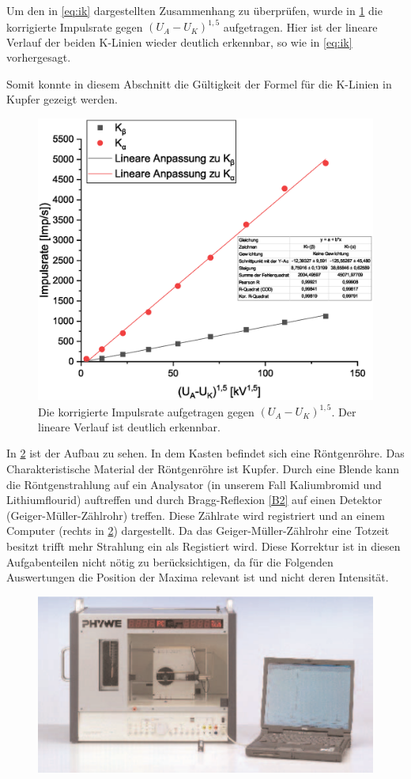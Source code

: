 \documentclass[
	a4paper,
	12pt,
	pagesize,
	ngerman
]{scrartcl}
\begin{document}
 Um den in \cref{eq:ik} dargestellten Zusammenhang zu überprüfen, wurde in \cref{spannung2} die korrigierte Impulsrate gegen $(U_A - U_K)^{1,5}$ aufgetragen. Hier ist der lineare Verlauf der beiden K-Linien wieder deutlich erkennbar, so wie in \cref{eq:ik} vorhergesagt.
 
 Somit konnte in diesem Abschnitt die Gültigkeit der Formel für die K-Linien in Kupfer gezeigt werden.

\begin{figure}[h!]
	\centering
	\includegraphics[scale = 0.6]{spannung2.eps}
	\caption{Die korrigierte Impulsrate aufgetragen gegen $(U_A-U_K)^{1,5}$. Der lineare Verlauf ist deutlich erkennbar.}
	\label{spannung2}
\end{figure}
In \cref{B1} ist der Aufbau zu sehen. In dem Kasten befindet sich eine Röntgenröhre. Das Charakteristische Material der Röntgenröhre ist Kupfer. Durch eine Blende kann die Röntgenstrahlung auf ein Analysator (in unserem Fall Kaliumbromid und Lithiumflourid) auftreffen und durch Bragg-Reflexion \cref{B2} auf einen Detektor (Geiger-Müller-Zählrohr) treffen. Diese Zählrate wird registriert und an einem Computer (rechts in \cref{B1}) dargestellt. Da das Geiger-Müller-Zählrohr eine Totzeit besitzt trifft mehr Strahlung ein als Registiert wird. Diese Korrektur ist in diesen Aufgabenteilen nicht nötig zu berücksichtigen, da für die Folgenden Auswertungen die Position der Maxima relevant ist und nicht deren Intensität.
\begin{figure}[h!]
    \centering
    \includegraphics[scale = 1]{aufbau.png}
    \caption{}
    \label{B1}
\end{figure}
\end{document}
